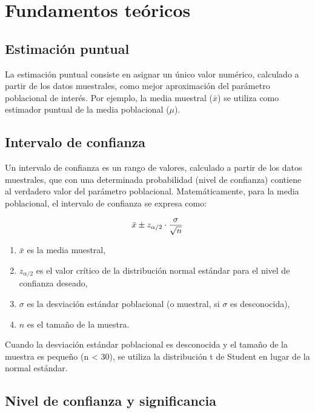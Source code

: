 \documentclass[
  spanish,
  letterpaper,
]{book}
\begin{document}
\section{Fundamentos teóricos}\label{fundamentos-teuxf3ricos}

\subsection{Estimación puntual}\label{estimaciuxf3n-puntual}

La estimación puntual consiste en asignar un único valor numérico,
calculado a partir de los datos muestrales, como mejor aproximación del
parámetro poblacional de interés. Por ejemplo, la media muestral
(\(\bar{x}\)) se utiliza como estimador puntual de la media poblacional
(\(\mu\)).

\subsection{Intervalo de confianza}\label{intervalo-de-confianza}

Un intervalo de confianza es un rango de valores, calculado a partir de
los datos muestrales, que con una determinada probabilidad (nivel de
confianza) contiene al verdadero valor del parámetro poblacional.
Matemáticamente, para la media poblacional, el intervalo de confianza se
expresa como:

\[\huge \bar{x} \pm z_{\alpha/2} \cdot \frac{\sigma}{\sqrt{n}}\]

\begin{enumerate}
\def\labelenumi{\arabic{enumi}.}
\item
  \(\bar{x}\) es la media muestral,
\item
  \(z_{\alpha/2}\) es el valor crítico de la distribución normal
  estándar para el nivel de confianza deseado,
\item
  \(\sigma\) es la desviación estándar poblacional (o muestral, si
  \(\sigma\) es desconocida),
\item
  \(n\) es el tamaño de la muestra.
\end{enumerate}

Cuando la desviación estándar poblacional es desconocida y el tamaño de
la muestra es pequeño (n \textless{} 30), se utiliza la distribución t
de Student en lugar de la normal estándar.

\subsection{Nivel de confianza y
significancia}\label{nivel-de-confianza-y-significancia}
\end{document}
